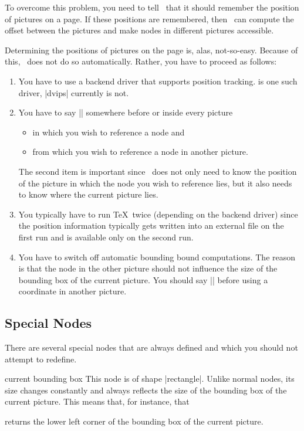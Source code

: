 To overcome this problem, you need to tell \pgfname\ that it should remember
the position of pictures on a page. If these positions are remembered, then
\pgfname\ can compute the offset between the pictures and make nodes in
different pictures accessible.

Determining the positions of pictures on the page is, alas, not-so-easy.
Because of this, \pgfname\ does not do so automatically. Rather, you have to
proceed as follows:
%
\begin{enumerate}
    \item You have to use a backend driver that supports position tracking.
         is one such driver, |dvips| currently is not.
    \item You have to say |\pgfrememberpicturepositiononpagetrue| somewhere
        before or inside every picture
        \begin{itemize}
            \item in which you wish to reference a node and
            \item from which you wish to reference a node in another picture.
        \end{itemize}
        The second item is important since \pgfname\ does not only need to know
        the position of the picture in which the node you wish to reference
        lies, but it also needs to know where the current picture lies.
    \item You typically have to run \TeX\ twice (depending on the backend
        driver) since the position information typically gets written into an
        external file on the first run and is available only on the second run.
    \item You have to switch off automatic bounding bound computations. The
        reason is that the node in the other picture should not influence the
        size of the bounding box of the current picture. You should say
        || before using a coordinate in another
        picture.
\end{enumerate}


\subsection{Special Nodes}

There are several special nodes that are always defined and which you should
not attempt to redefine.

\begin{predefinednode}{current bounding box}
    This node is of shape |rectangle|. Unlike normal nodes, its size changes
    constantly and always reflects the size of the bounding box of the current
    picture. This means that, for instance, that
\begin{codeexample}
\end{codeexample}
    returns the lower left corner of the bounding box of the current picture.
\end{predefinednode}

